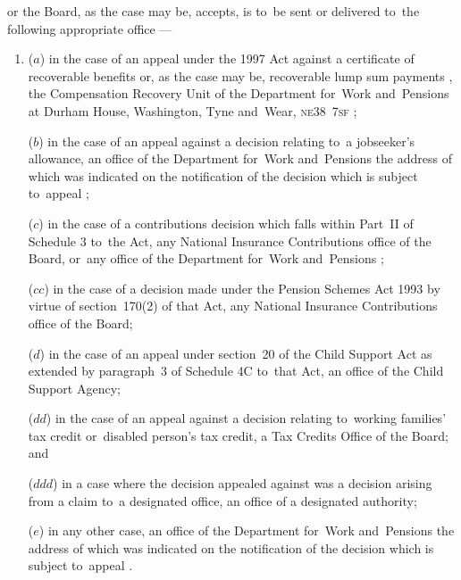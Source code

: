 \documentclass[12pt,a4paper]{article}
\begin{document}
or the Board, as the case may be, accepts, is to~be sent or delivered to~the following appropriate office%
—
\begin{enumerate}\item[]
($a$) in the case of an appeal under the 1997 Act against a certificate of recoverable benefits
or, as the case may be, recoverable lump sum payments%
, the Compensation Recovery Unit of the 
Department for~Work and~Pensions  %
at 
Durham House, Washington, Tyne and~Wear, \textsc{\lowercase{NE38~7SF}}%
;

($b$) in the case of an appeal against a decision relating to~a jobseeker’s allowance, an office of the 
Department for~Work and~Pensions the address of which was indicated on the notification of the decision which is subject to~appeal%
;

($c$) in the case of a contributions decision which falls within Part~II of Schedule 3 to~the Act, any National Insurance Contributions office
of the Board, or~any office of the 
Department for~Work and~Pensions%
;  %

($cc$) in the case of a decision made under the Pension Schemes Act 1993 by virtue of section~170(2) of that Act, any National Insurance Contributions office of the Board;

($d$) in the case of an appeal under section~20 of the Child Support Act as extended by paragraph~3 of Schedule 4C to~that Act, an office of the Child Support Agency; %

($dd$) in the case of an appeal against a decision relating to~working families' tax credit or~disabled person’s tax credit, a Tax Credits Office of the Board; and

($ddd$) in a case where the decision appealed against was a decision arising from a claim to~a designated office, an office of a designated authority;

($e$) in any other case, an office of the 
Department for~Work and~Pensions the address of which was indicated on the notification of the decision which is subject to~appeal%
.
\end{enumerate}
\end{document}
